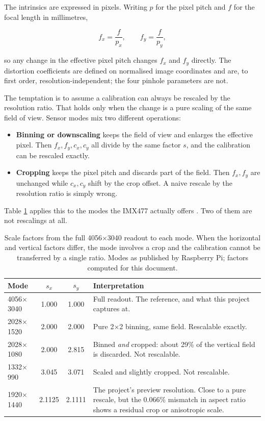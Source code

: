 The intrinsics are expressed in pixels. Writing $p$ for the pixel pitch and $f$ for the focal length in millimetres,

\begin{equation}
f_x = \frac{f}{p_x}, \qquad f_y = \frac{f}{p_y} ,
\label{eq:fx}
\end{equation}

so any change in the effective pixel pitch changes $f_x$ and $f_y$ directly. The distortion coefficients are defined on normalised image coordinates and are, to first order, resolution-independent; the four pinhole parameters are not.

The temptation is to assume a calibration can always be rescaled by the resolution ratio. That holds only when the change is a pure scaling of the same field of view. Sensor modes mix two different operations:

\begin{itemize}
    \item \textbf{Binning or downscaling} keeps the field of view and enlarges the effective pixel. Then $f_x, f_y, c_x, c_y$ all divide by the same factor $s$, and the calibration can be rescaled exactly.
    \item \textbf{Cropping} keeps the pixel pitch and discards part of the field. Then $f_x, f_y$ are unchanged while $c_x, c_y$ shift by the crop offset. A naive rescale by the resolution ratio is simply wrong.
\end{itemize}

Table \ref{tab:modes} applies this to the modes the IMX477 actually offers \cite{raspberrypi_camera_docs_placeholder}. Two of them are not rescalings at all.

\begin{table}[!ht]
\centering
\small
\caption[IMX477 modes and whether a calibration can be rescaled between them]{Scale factors from the full 4056$\times$3040 readout to each mode. When the horizontal and vertical factors differ, the mode involves a crop and the calibration cannot be transferred by a single ratio. Modes as published by Raspberry Pi; factors computed for this document.}
\label{tab:modes}
\begin{tabularx}{\textwidth}{l c c X}
\toprule
\textbf{Mode} & \textbf{$s_x$} & \textbf{$s_y$} & \textbf{Interpretation} \\
\midrule
4056$\times$3040 & 1.000 & 1.000 & Full readout. The reference, and what this project captures at. \\
2028$\times$1520 & 2.000 & 2.000 & Pure 2$\times$2 binning, same field. Rescalable exactly. \\
2028$\times$1080 & 2.000 & 2.815 & Binned \emph{and} cropped: about 29\% of the vertical field is discarded. Not rescalable. \\
1332$\times$990  & 3.045 & 3.071 & Scaled and slightly cropped. Not rescalable. \\
1920$\times$1440 & 2.1125 & 2.1111 & The project's preview resolution. Close to a pure rescale, but the 0.066\% mismatch in aspect ratio shows a residual crop or anisotropic scale. \\
\bottomrule
\end{tabularx}
\end{table}

